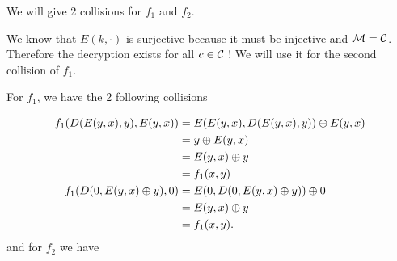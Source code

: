 \begin{solution}
  We will give 2 collisions for $f_1$ and $f_2$.

  We know that $E(k, \cdot)$ is surjective because it must be injective and $\mathcal{M} = \mathcal{C}$.
  Therefore the decryption exists for all $c \in \mathcal{C}$ ! We will use it for the second collision of $f_1$.

  For $f_1$, we have the 2 following collisions

  \begin{align*}
    f_1(D(E(y,x),y), E(y,x))
    & = E(E(y,x), D(E(y,x), y)) \oplus E(y,x)\\
    & = y \oplus E(y,x)\\
    & = E(y,x) \oplus y\\
    & = f_1(x, y)\\
    f_1(D(0, E(y,x) \oplus y), 0)
    & = E(0, D(0, E(y, x) \oplus y)) \oplus 0\\
    & = E(y, x) \oplus y\\
    & = f_1(x, y).
  \end{align*}
  and for $f_2$ we have


\end{solution}
